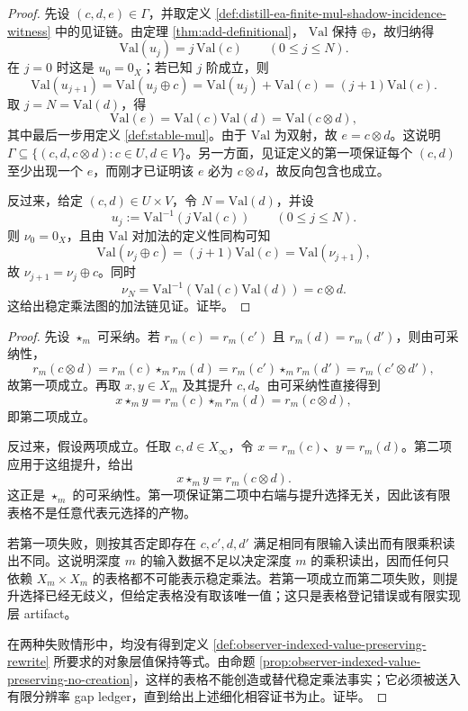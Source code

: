 \begin{proof}
先设 \((c,d,e)\in\Gamma\)，并取定义 \ref{def:distill-ea-finite-mul-shadow-incidence-witness} 中的见证链。由定理 \ref{thm:add-definitional}，
\(\mathrm{Val}\) 保持 \(\oplus\)，故归纳得
\[
\mathrm{Val}(u_j)=j\,\mathrm{Val}(c)\qquad(0\le j\le N).
\]
在 \(j=0\) 时这是 \(u_0=0_X\)；若已知 \(j\) 阶成立，则
\[
\mathrm{Val}(u_{j+1})=\mathrm{Val}(u_j\oplus c)
=\mathrm{Val}(u_j)+\mathrm{Val}(c)
=(j+1)\mathrm{Val}(c).
\]
取 \(j=N=\mathrm{Val}(d)\)，得
\[
\mathrm{Val}(e)=\mathrm{Val}(c)\mathrm{Val}(d)=\mathrm{Val}(c\otimes d),
\]
其中最后一步用定义 \ref{def:stable-mul}。由于 \(\mathrm{Val}\) 为双射，故 \(e=c\otimes d\)。这说明
\(\Gamma\subseteq\{(c,d,c\otimes d):c\in U,d\in V\}\)。另一方面，见证定义的第一项保证每个 \((c,d)\) 至少出现一个 \(e\)，而刚才已证明该 \(e\) 必为 \(c\otimes d\)，故反向包含也成立。

反过来，给定 \((c,d)\in U\times V\)，令 \(N=\mathrm{Val}(d)\)，并设
\[
u_j:=\mathrm{Val}^{-1}(j\,\mathrm{Val}(c))\qquad(0\le j\le N).
\]
则 \(\nu_0=0_X\)，且由 \(\mathrm{Val}\) 对加法的定义性同构可知
\[
\mathrm{Val}(\nu_j\oplus c)=(j+1)\mathrm{Val}(c)=\mathrm{Val}(\nu_{j+1}),
\]
故 \(\nu_{j+1}=\nu_j\oplus c\)。同时
\[
\nu_N=\mathrm{Val}^{-1}(\mathrm{Val}(c)\mathrm{Val}(d))=c\otimes d.
\]
这给出稳定乘法图的加法链见证。证毕。
\end{proof}

\begin{proof}
先设 \(\star_m\) 可采纳。若
\(r_m(c)=r_m(c')\) 且 \(r_m(d)=r_m(d')\)，则由可采纳性，
\[
r_m(c\otimes d)=r_m(c)\star_m r_m(d)
=r_m(c')\star_m r_m(d')=r_m(c'\otimes d'),
\]
故第一项成立。再取 \(x,y\in X_m\) 及其提升 \(c,d\)。由可采纳性直接得到
\[
x\star_m y=r_m(c)\star_m r_m(d)=r_m(c\otimes d),
\]
即第二项成立。

反过来，假设两项成立。任取 \(c,d\in X_\infty\)，令
\(x=r_m(c)\)、\(y=r_m(d)\)。第二项应用于这组提升，给出
\[
x\star_m y=r_m(c\otimes d).
\]
这正是 \(\star_m\) 的可采纳性。第一项保证第二项中右端与提升选择无关，因此该有限表格不是任意代表元选择的产物。

若第一项失败，则按其否定即存在 \(c,c',d,d'\) 满足相同有限输入读出而有限乘积读出不同。这说明深度 \(m\) 的输入数据不足以决定深度 \(m\) 的乘积读出，因而任何只依赖 \(X_m\times X_m\) 的表格都不可能表示稳定乘法。若第一项成立而第二项失败，则提升选择已经无歧义，但给定表格没有取该唯一值；这只是表格登记错误或有限实现层 artifact。

在两种失败情形中，均没有得到定义 \ref{def:observer-indexed-value-preserving-rewrite} 所要求的对象层值保持等式。由命题 \ref{prop:observer-indexed-value-preserving-no-creation}，这样的表格不能创造或替代稳定乘法事实；它必须被送入有限分辨率 gap ledger，直到给出上述细化相容证书为止。证毕。
\end{proof}

